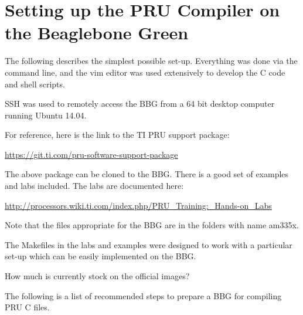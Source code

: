 %
%
%

\chapter{Setting up the PRU Compiler on the Beaglebone Green}

The following describes the simplest possible set-up.  Everything was done via the command line, and the vim editor was used extensively to develop the C code and shell scripts.

SSH was used to remotely access the BBG from a 64 bit desktop computer running Ubuntu 14.04.

For reference, here is the link to the TI PRU support package:

\url{https://git.ti.com/pru-software-support-package}

The above package can be cloned to the BBG.  There is a good set of examples and labs included.  The labs are documented here:

\url{http://processors.wiki.ti.com/index.php/PRU_Training:_Hands-on_Labs}

Note that the files appropriate for the BBG are in the folders with name am335x.

The Makefiles in the labs and examples were designed to work with a particular set-up which can be easily implemented on the BBG.

How much is currently stock on the official images?

The following is a list of recommended steps to prepare a BBG for compiling PRU C files.

